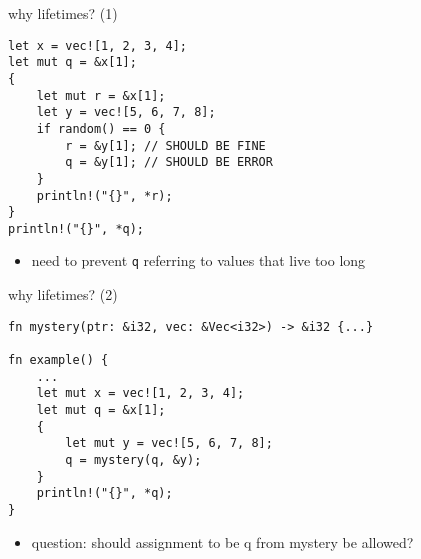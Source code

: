 \begin{frame}[fragile,label=whyLifetime1]{why lifetimes? (1)}
\begin{verbatim}
let x = vec![1, 2, 3, 4];
let mut q = &x[1];
{
    let mut r = &x[1];
    let y = vec![5, 6, 7, 8];
    if random() == 0 {
        r = &y[1]; // SHOULD BE FINE
        q = &y[1]; // SHOULD BE ERROR
    }
    println!("{}", *r);
}
println!("{}", *q);
\end{verbatim}
\begin{itemize}
\item need to prevent \texttt{q} referring to values that live too long
\end{itemize}
\end{frame}

\begin{frame}[fragile,label=whyLifetime2]{why lifetimes? (2)}
\begin{verbatim}
fn mystery(ptr: &i32, vec: &Vec<i32>) -> &i32 {...}

fn example() {
    ...
    let mut x = vec![1, 2, 3, 4];
    let mut q = &x[1];
    {
        let mut y = vec![5, 6, 7, 8];
        q = mystery(q, &y);
    }
    println!("{}", *q);
}
\end{verbatim}
\begin{itemize}
\item question: should assignment to be q from mystery be allowed?
\end{itemize}
\end{frame}
